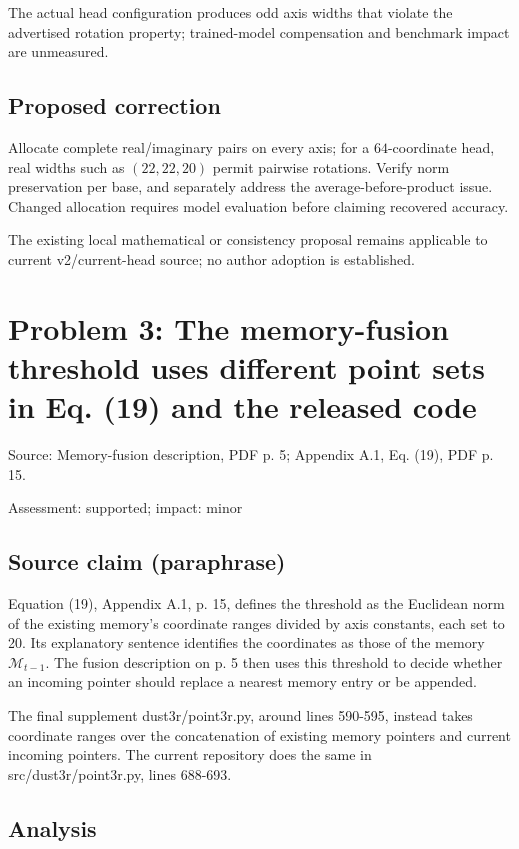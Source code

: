 \documentclass[11pt]{article}
\begin{document}
The actual head configuration produces odd axis widths that violate the advertised rotation property; trained-model compensation and benchmark impact are unmeasured.

\subsection*{Proposed correction}

Allocate complete real/imaginary pairs on every axis; for a \(64\)-coordinate head, real widths such as \((22,22,20)\) permit pairwise rotations. Verify norm preservation per base, and separately address the average-before-product issue. Changed allocation requires model evaluation before claiming recovered accuracy.

The existing local mathematical or consistency proposal remains applicable to current v2/current-head source; no author adoption is established.

\section*{Problem 3: The memory-fusion threshold uses different point sets in Eq. (19) and the released code}

Source: Memory-fusion description, PDF p. 5; Appendix A.1, Eq. (19), PDF p. 15.

Assessment: supported; impact: minor

\subsection*{Source claim (paraphrase)}

Equation (19), Appendix A.1, p. 15, defines the threshold as the Euclidean norm of the existing memory’s coordinate ranges divided by axis constants, each set to 20. Its explanatory sentence identifies the coordinates as those of the memory \(\mathcal M_{t-1}\). The fusion description on p. 5 then uses this threshold to decide whether an incoming pointer should replace a nearest memory entry or be appended.

The final supplement dust3r/point3r.py, around lines 590-595, instead takes coordinate ranges over the concatenation of existing memory pointers and current incoming pointers. The current repository does the same in src/dust3r/point3r.py, lines 688-693.

\subsection*{Analysis}
\end{document}
